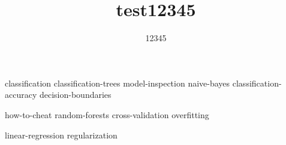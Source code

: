 \documentclass[symmetric, justified, a4paper]{tufte-book}
\title{test12345}
\author[Test123]{12345}
\begin{document}
\frontmatter

\maketitle



\tableofcontents

%

\mainmatter





 {classification}
 {classification-trees}
 {model-inspection}
 {naive-bayes}
 {classification-accuracy}
 {decision-boundaries}

 {how-to-cheat}
 {random-forests}
 {cross-validation}
 {overfitting}




 {linear-regression}
{regularization}
\end{document}
